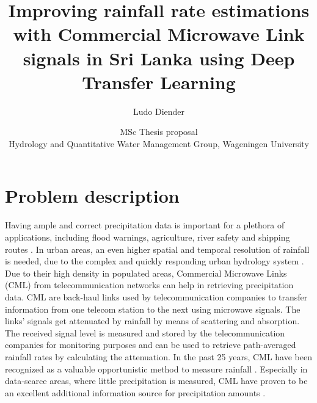 \documentclass[twocolumn, 10pt, a4paper]{article}
\begin{document}
	\title{\vspace{-1cm}\Huge{Improving rainfall rate estimations with Commercial Microwave Link signals in Sri Lanka using Deep Transfer Learning}}
	\author{\Large{Ludo Diender}}
	\date{\normalsize{MSc Thesis proposal\\
			Hydrology and Quantitative Water Management Group,
			Wageningen University}}
	
	\maketitle
	
	\section{Problem description}
	
	Having ample and correct precipitation data is important for a plethora of applications, including flood warnings, agriculture, river safety and shipping routes . In urban areas, an even higher spatial and temporal resolution of rainfall is needed, due to the complex and quickly responding urban hydrology system . Due to their high density in populated areas, Commercial Microwave Links (CML) from telecommunication networks can help in retrieving precipitation data. CML are back-haul links used by telecommunication companies to transfer information from one telecom station to the next using microwave signals. The links' signals get attenuated by rainfall by means of scattering and absorption. The received signal level is measured and stored by the telecommunication companies for monitoring purposes and can be used to retrieve path-averaged rainfall rates by calculating the attenuation. In the past 25 years, CML have been recognized as a valuable opportunistic method to measure rainfall . Especially in data-scarce areas, where little precipitation is measured, CML have proven to be an excellent additional information source for precipitation amounts .   
	
\end{document}
